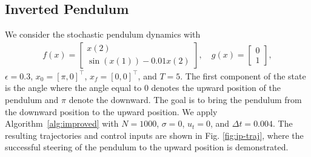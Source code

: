 \documentclass[letterpaper, 10 pt, conference]{ieeeconf}  %
\newcommand{\ud}{\,\mathrm{d}}
\begin{document}
\subsection{Inverted Pendulum}\label{sec:IP-exp}
We consider the  stochastic pendulum dynamics with 
\begin{align*}
    f(x) =  \begin{bmatrix}
        x(2) \\
        \sin(x(1)) - 0.01x(2)
    \end{bmatrix},\quad g(x) = \begin{bmatrix}
        0\\1
    \end{bmatrix},
\end{align*}
$\epsilon=0.3$, $x_0=[\pi,0]^\top$, $x_f = [0,0]^\top$, and $T=5$. The first component of the state is the angle where the angle equal to $0$ denotes the upward position of the pendulum and $\pi$ denote the downward. The goal is to bring the pendulum from the downward position to the upward position. We apply Algorithm~\ref{alg:improved} with $N=1000$, $\sigma=0$, $u_t=0$, and $\Delta t =0.004$. The resulting trajectories and control inputs are shown in Fig. \ref{fig:ip-traj}, where the successful steering of the pendulum to the upward position is demonstrated. 
\end{document}
